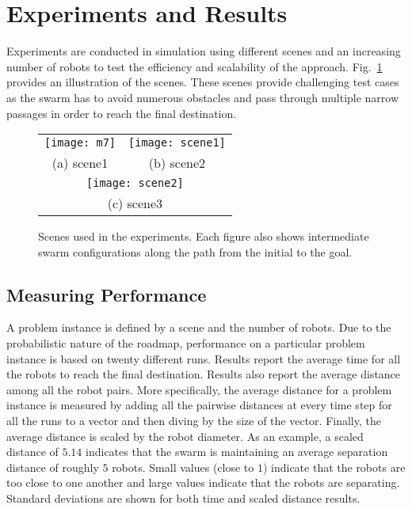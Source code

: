 \section{Experiments and Results}
\label{sec:ExpResults}

Experiments are conducted in simulation using different scenes and an
increasing number of robots to test the efficiency and scalability of
the approach. Fig.~\ref{fig:Scenes} provides an illustration of the
scenes. These scenes provide challenging test cases as the swarm has
to avoid numerous obstacles and pass through multiple narrow passages
in order to reach the final destination.

\begin{figure}
\begin{tabular}{cc}
\texttt{[image: m7]}&
\texttt{[image: scene1]}\\
(a) scene1 & (b) scene2\\
\multicolumn{2}{c}{\texttt{[image: scene2]}}\\
\multicolumn{2}{c}{(c) scene3}
\end{tabular}
\caption{Scenes used in the experiments. Each figure also shows
  intermediate swarm configurations along the path from the initial to
the goal.} 
\label{fig:Scenes}
\end{figure}

\subsection{Measuring Performance}
\label{sec:Measures}
A problem instance is defined by a scene and the number of robots. Due
to the probabilistic nature of the roadmap, performance on a
particular problem instance is based on twenty different runs.
Results report the average time for all the robots to reach the final
destination. Results also report the average distance among all the
robot pairs. More specifically, the average distance for a problem instance is measured by
adding all the pairwise distances at every time step for all the runs
to a vector and then diving by the size of the vector. Finally, the
average distance is scaled by the robot diameter. As an example, a
scaled distance of $5.14$ indicates that the swarm is maintaining an average
separation distance of roughly $5$ robots.  Small values (close to $1$)
indicate that the robots are too close to one another and large values
indicate that the robots are separating. Standard deviations are shown
for both time and scaled distance results.


